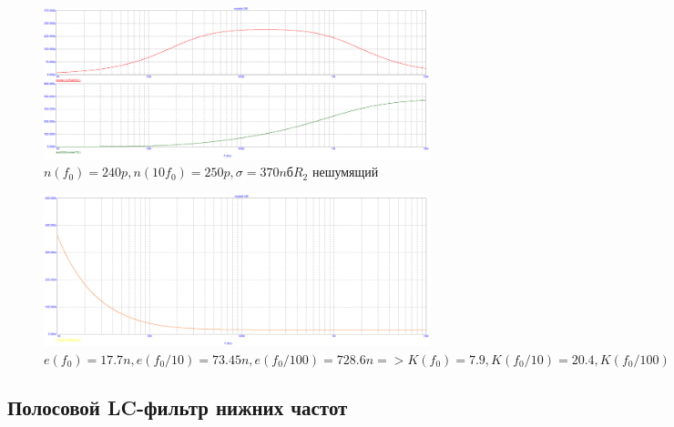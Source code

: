 \documentclass[a4paper, 12pt]{article}%
\begin{document}
\begin{enumerate}
\begin{figure}
    \centering
    \includegraphics[scale=0.3]{images/mod4_2_2_3.png}
    \caption{$n(f_0) = 240p, n(10 f_0) = 250p, \sigma = 370nб R_2$ нешумящий}
    \label{fig:m4223}
\end{figure}

\begin{figure}
    \centering
    \includegraphics[scale=0.3]{images/mod4_2_3.png}
    \caption{$e(f_0) = 17.7n, e(f_0/10) = 73.45n, e(f_0/100) = 728.6n => K(f_0) = 7.9, K(f_0/10) = 20.4, K(f_0/100) = 41$}
    \label{fig:m423}
\end{figure}
\FloatBarrier


\end{enumerate}

\subsection*{Полосовой LC-фильтр нижних частот}
\end{document}
